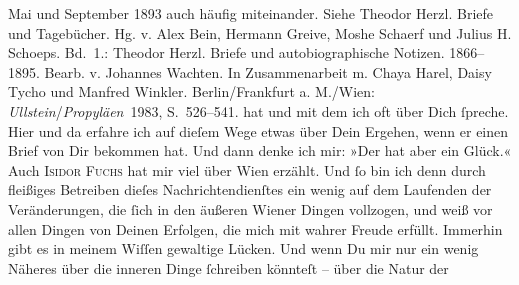 \begin{ledgroupsized}[t]{13cm}
{{{                     Mai und September{ }1893 auch häufig miteinander. Siehe Theodor Herzl. Briefe und Tagebücher.
                     Hg. v. Alex Bein, Hermann Greive, Moshe Schaerf und Julius H. Schoeps. Bd. 1.:
                        Theodor Herzl. Briefe und
                     autobiographische Notizen. 1866–1895. Bearb. v. Johannes Wachten. In Zusammenarbeit m. Chaya Harel,
                     Daisy Tycho und Manfred Winkler. Berlin/Frankfurt a. M./Wien: \emph{Ullstein}/\emph{Propyläen} 1983,
                     S. 526–541.}}}\label{K_L02708-2h} hat und mit dem ich oft über Dich ſpreche. Hier und da erfahre ich auf dieſem
               Wege etwas über Dein Ergehen, wenn er einen Brief von Dir bekommen hat. Und dann
               denke ich mir: »Der hat aber ein Glück.« Auch \textsc{Isidor Fuchs} hat mir viel über Wien erzählt. Und ſo  bin ich denn durch fleißiges  Betreiben
               dieſes Nachrichtendienſtes ein wenig auf dem Laufenden der Veränderungen, die ſich in
               den äußeren Wiener Dingen vollzogen, und weiß vor
               allen Dingen von Deinen Erfolgen, die mich mit wahrer Freude {\pb}erfüllt. Immerhin gibt es in meinem Wiſſen gewaltige
               Lücken. Und wenn Du mir nur ein wenig Näheres über die inneren Dinge ſchreiben
               könnteſt – über die Natur der \label{K_L02708-3v}
\end{ledgroupsized}
